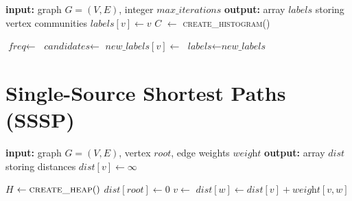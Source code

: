 \begin{algorithm}[h!]
\begin{algorithmic}[1]
\Statex \textbf{input:} graph $G=(V,E)$, integer $\textit{max\_iterations}$
\Statex \textbf{output:} array $\textit{labels}$ storing vertex communities
  \State $\textit{labels}[v] \gets v$
\EndFor
{}
  \State $C$ $\gets$ \textsc{create\_histogram()}

    \State {}
  \EndFor
    \State {}
  \EndFor
  \State $\textit{freq} \gets $ 
  \State $\textit{candidates} \gets$ 
  \State $\textit{new\_labels}[v] \gets$ 
 \EndFor
 \State $\textit{labels} \gets \textit{new\_labels}$
\EndFor
\end{algorithmic}
\end{algorithm}



\section{Single-Source Shortest Paths (SSSP)}

\begin{algorithm}[h!]
\begin{algorithmic}[1]
\Statex \textbf{input:} graph $G=(V,E)$, vertex $\textit{root}$, edge weights $\textit{weight}$
\Statex \textbf{output:} array $\textit{dist}$ storing distances
  \State $\textit{dist}[v] \gets \infty$
\EndFor

\State $H$ $\gets \Call{create\_heap}{ }$
\State {}
\State $\textit{dist}[\textit{root}] \gets 0$
  \State $v \gets$ 
      \State $\textit{dist}[w] \gets \textit{dist}[v] + \textit{weight}[v,w]$
      \State {}
    \EndIf
  \EndFor
\EndWhile
\end{algorithmic}
\end{algorithm}
